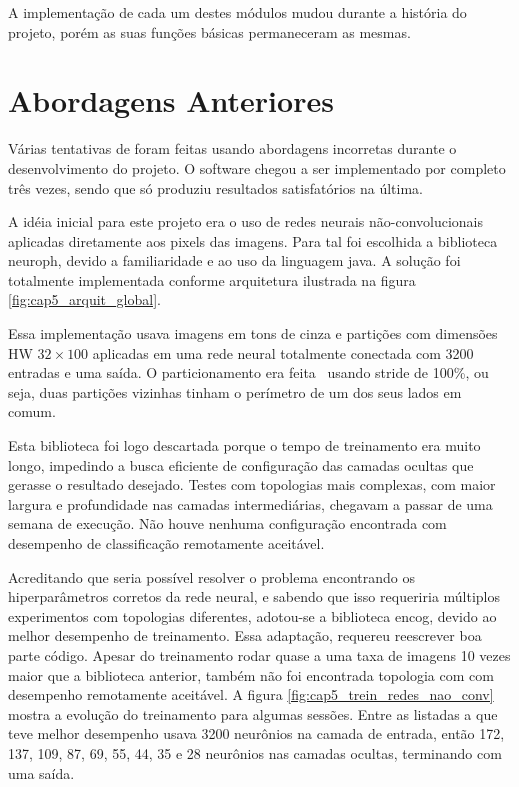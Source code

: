 A implementação de cada um destes módulos mudou durante a história do projeto,
porém as suas funções básicas permaneceram as mesmas.

\section{Abordagens Anteriores}
Várias tentativas de foram feitas usando abordagens incorretas durante o
desenvolvimento do projeto. O software chegou a ser implementado por completo
três vezes, sendo que só produziu resultados satisfatórios na última.

A idéia inicial para este projeto era o uso de redes neurais não-convolucionais
aplicadas diretamente aos pixels das imagens. Para tal foi escolhida a
biblioteca neuroph, devido a familiaridade e ao uso da linguagem java. A
solução foi totalmente implementada conforme arquitetura ilustrada na figura
\ref{fig:cap5_arquit_global}.

Essa implementação usava imagens em tons de cinza e partições com dimensões HW
$32 \times 100$ aplicadas em uma rede neural totalmente conectada com 3200
entradas e uma saída. O particionamento era feita  usando stride de 100\%, ou
seja, duas partições vizinhas tinham o perímetro de um dos seus lados em comum.

Esta biblioteca foi logo descartada porque o tempo de treinamento era muito
longo, impedindo a busca eficiente de configuração das camadas ocultas que
gerasse o resultado desejado. Testes com topologias mais complexas, com maior
largura e profundidade nas camadas intermediárias, chegavam a passar de uma
semana de execução. Não houve nenhuma configuração encontrada com desempenho de
classificação remotamente aceitável.

Acreditando que seria possível resolver o problema encontrando os
hiperparâmetros corretos da rede neural, e sabendo que isso requeriria
múltiplos experimentos com topologias diferentes, adotou-se a biblioteca encog,
devido ao melhor desempenho de treinamento. Essa adaptação, requereu reescrever
boa parte código. Apesar do treinamento rodar quase a uma taxa de imagens 10
vezes maior que a biblioteca anterior, também não foi encontrada topologia
com com desempenho remotamente aceitável. A figura
\ref{fig:cap5_trein_redes_nao_conv} mostra a
evolução do treinamento para algumas sessões. Entre as listadas a que teve
melhor desempenho usava 3200 neurônios na camada de entrada, então 172, 137,
109, 87, 69, 55, 44, 35 e 28 neurônios nas camadas ocultas, terminando
com uma saída.

